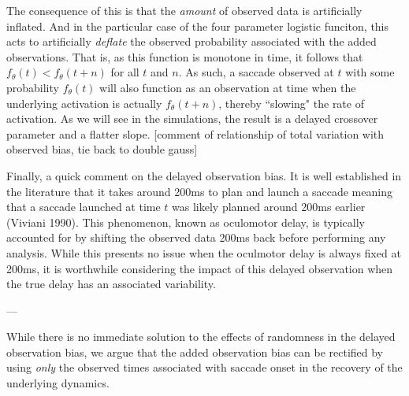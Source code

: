 \documentclass{article}
\begin{document}
The consequence of this is that the \textit{amount} of observed data is artificially inflated. And in the particular case of the four parameter logistic funciton, this acts to artificially \textit{deflate} the observed probability associated with the added observations. That is, as this function is monotone in time, it follows that $f_{\theta}(t) < f_{\theta}(t+n)$ for all $t$ and $n$. As such, a saccade observed at $t$ with some probability $f_{\theta}(t)$ will also function as an observation at time when the underlying activation is actually $f_{\theta}(t+n)$, thereby ``slowing" the rate of activation. As we will see in the simulations, the result is a delayed crossover parameter and a flatter slope. [comment of relationship of total variation with observed bias, tie back to double gauss]

Finally, a quick comment on the delayed observation bias. It is well established in the literature that it takes around 200ms to plan and launch a saccade meaning that a saccade launched at time $t$ was likely planned around 200ms earlier (Viviani 1990). This phenomenon, known as oculomotor delay, is typically accounted for by shifting the observed data 200ms back before performing any analysis. While this presents no issue when the oculmotor delay is always fixed at 200ms, it is worthwhile considering the impact of this delayed observation when the true delay has an associated variability.

---

While there is no immediate solution to the effects of randomness in the delayed observation bias, we argue that the added observation bias can be rectified by using \textit{only} the observed times associated with saccade onset in the recovery of the underlying dynamics.
\end{document}
